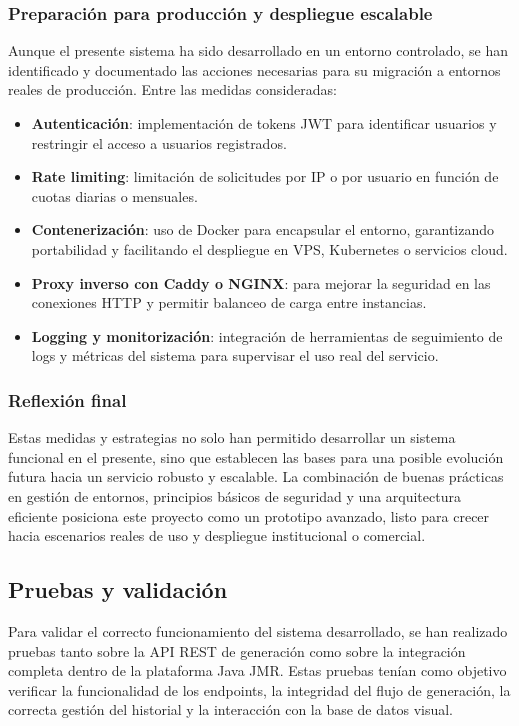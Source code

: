 \subsubsection{Preparación para producción y despliegue escalable}

Aunque el presente sistema ha sido desarrollado en un entorno controlado, se han identificado y documentado las acciones necesarias para su migración a entornos reales de producción. Entre las medidas consideradas:

\begin{itemize}
    \item \textbf{Autenticación}: implementación de tokens JWT para identificar usuarios y restringir el acceso a usuarios registrados.
    \item \textbf{Rate limiting}: limitación de solicitudes por IP o por usuario en función de cuotas diarias o mensuales.
    \item \textbf{Contenerización}: uso de Docker para encapsular el entorno, garantizando portabilidad y facilitando el despliegue en VPS, Kubernetes o servicios cloud.
    \item \textbf{Proxy inverso con Caddy o NGINX}: para mejorar la seguridad en las conexiones HTTP y permitir balanceo de carga entre instancias.
    \item \textbf{Logging y monitorización}: integración de herramientas de seguimiento de logs y métricas del sistema para supervisar el uso real del servicio.
\end{itemize}

\subsubsection{Reflexión final}
Estas medidas y estrategias no solo han permitido desarrollar un sistema funcional en el presente, sino que establecen las bases para una posible evolución futura hacia un servicio robusto y escalable. La combinación de buenas prácticas en gestión de entornos, principios básicos de seguridad y una arquitectura eficiente posiciona este proyecto como un prototipo avanzado, listo para crecer hacia escenarios reales de uso y despliegue institucional o comercial.


\subsection{Pruebas y validación}

Para validar el correcto funcionamiento del sistema desarrollado, se han realizado pruebas tanto sobre la API REST de generación como sobre la integración completa dentro de la plataforma Java JMR. Estas pruebas tenían como objetivo verificar la funcionalidad de los endpoints, la integridad del flujo de generación, la correcta gestión del historial y la interacción con la base de datos visual.

